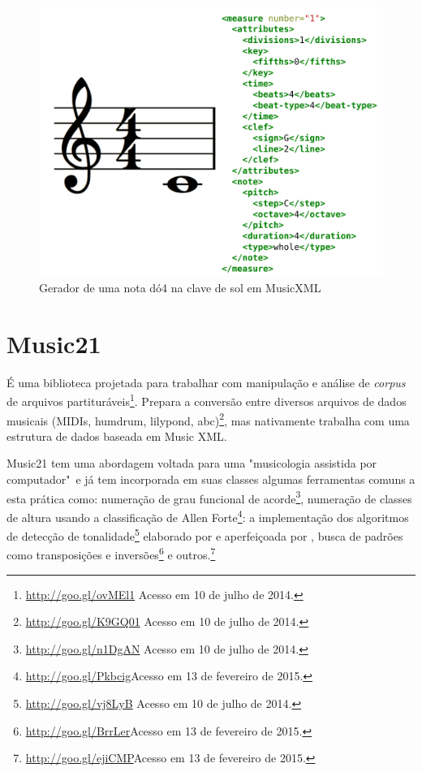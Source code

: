 \documentclass[
	12pt,				%
	openright,			%
	twoside,			%
	a4paper,			%
	english,			%
	french,				%
	spanish,			%
	brazil				%
	]{abntex2}
\begin{document}
\begin{figure}[htb]
	\caption{\label{fig_grafico}Gerador de uma nota dó4 na clave de sol em MusicXML}
	\begin{center}
	    \includegraphics[scale=0.5]{score/musicxml.pdf}
	\end{center}
\end{figure}


\section{Music21}
\label{m21}

É uma biblioteca projetada para trabalhar com manipulação e análise de \textit{corpus} de arquivos partituráveis\footnote{\url{http://goo.gl/ovMEl1} Acesso em 10 de julho de 2014.}. Prepara a conversão entre diversos arquivos de dados musicais (MIDIs, humdrum, lilypond, abc)\footnote{\url{http://goo.gl/K9GQ01} Acesso em 10 de julho de 2014.}, mas nativamente trabalha com uma estrutura de dados baseada em Music XML.

Music21 tem uma abordagem voltada para uma "musicologia assistida por computador"\ e já tem incorporada em suas classes algumas ferramentas comuns a esta prática como: numeração de grau funcional de acorde\footnote{\url{http://goo.gl/n1DgAN} Acesso em 10 de julho de 2014.}, numeração de classes de altura usando a classificação de Allen Forte\footnote{\url{http://goo.gl/Pkbcig}Acesso em 13 de fevereiro de 2015.}: a implementação dos algoritmos de detecção de tonalidade\footnote{\url{http://goo.gl/vj8LyB} Acesso em 10 de julho de 2014.} elaborado por  e aperfeiçoada por , busca de padrões como transposições e inversões\footnote{\url{http://goo.gl/BrrLer}Acesso em 13 de fevereiro de 2015.} e outros.\footnote{{\url{http://goo.gl/ejiCMP}Acesso em 13 de fevereiro de 2015.}}
\end{document}
